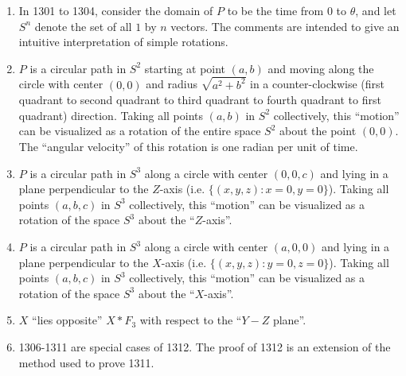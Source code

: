 \documentclass{article}
\begin{document}
\begin{enumerate}
  \item[] In 1301 to 1304, consider the domain of $P$ to be the time from $0$ to $\theta$, and let $S^{n}$ denote the set of all $1$ by $n$ vectors. The comments are intended to give an intuitive interpretation of simple rotations.
  \item[1301:] $P$ is a circular path in $S^2$ starting at point $(a,b)$ and moving along the circle with center $(0,0)$ and radius $\sqrt{a^2+b^2}$ in a counter-clockwise (first quadrant to second quadrant to third quadrant to fourth quadrant to first quadrant) direction. Taking all points $(a,b)$ in $S^2$ collectively, this ``motion'' can be visualized as a rotation of the entire space $S^2$ about the point $(0,0)$. The ``angular velocity'' of this rotation is one radian per unit of time.
  \item[1302:] $P$ is a circular path in $S^3$ along a circle with center $(0,0,c)$ and lying in a plane perpendicular to the $Z$-axis (i.e. $\{ (x,y,z): x=0, y=0 \}$). Taking all points $(a,b,c)$ in $S^3$ collectively, this ``motion'' can be visualized as a rotation of the space $S^3$ about the ``$Z$-axis''. 
  \item[1303:] $P$ is a circular path in $S^3$ along a circle with center $(a,0,0)$ and lying in a plane perpendicular to the $X$-axis (i.e. $\{ (x,y,z): y=0, z=0 \}$). Taking all points $(a,b,c)$ in $S^3$ collectively, this ``motion'' can be visualized as a rotation of the space $S^3$ about the ``$X$-axis''. 
  \item[1305:] $X$ ``lies opposite'' $X*F_3$ with respect to the ``$Y-Z$ plane''.
  \item[] 1306-1311 are special cases of 1312. The proof of 1312 is an extension of the method used to prove 1311.
\end{enumerate}
\vspace{0.5cm}
\end{document}
